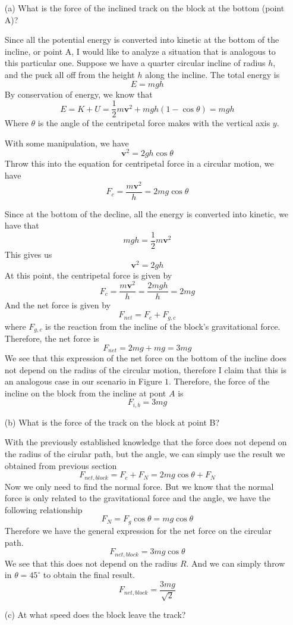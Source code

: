 \documentclass[12pt]{article}
\begin{document}
\begin{itemize}
\begin{enumerate}
    \item[(a)] What is the force of the inclined track on the block at the bottom (point A)?
    
    Since all the potential energy is converted into kinetic at the bottom of the incline, or point A, I would like to analyze a situation that is analogous to this particular one. Suppose we have a quarter circular incline of radius $h$, and the puck all off from the height $h$ along the incline. The total energy is
    \[
    E = mgh
    \]
    By conservation of energy, we know that
    \[
    E = K + U = \frac{1}{2}m\mathbf{v}^2 + mgh(1-\cos\theta) = mgh
    \]
    Where $\theta$ is the angle of the centripetal force makes with the vertical axis $y$. 

    With some manipulation, we have
    \[
    \mathbf{v}^2   = 2gh\cos\theta
    \]
    Throw this into the equation for centripetal force in a circular motion, we have
    \[
    F_c = \frac{m\mathbf{v}^2 }{h} = 2mg\cos\theta
    \]

    Since at the bottom of the decline, all the energy is converted into kinetic, we have that
    \[
    mgh = \frac{1}{2}m\mathbf{v}^2
    \]
    This gives us
    \[
    \mathbf{v}^2 = 2gh
    \]
    At this point, the centripetal force is given by
    \[
    F_c = \frac{m\mathbf{v}^2}{h} = \frac{2mgh}{h} = 2mg
    \]
    And the net force is given by
    \[
    F_{net} = F_c + F_{g,c} 
    \]
    where $F_{g,c}$ is the reaction from the incline of the block's gravitational force. Therefore, the net force is
    \[
    F_{net} = 2mg + mg = 3mg
    \]
    We see that this expression of the net force on the bottom of the incline does not depend on the radius of the circular motion, therefore I claim that this is an analogous case in our scenario in Figure $1$. Therefore, the force of the incline on the block from the incline at pont $A$ is
    \[
    F_{i,b} = 3mg
    \]

    
    \item[(b)] What is the force of the track on the block at point B?

    With the previously established knowledge that the force does not depend on the radius of the cirular path, but the angle, we can simply use the result we obtained from previous section
    \[
    F_{net,block} = F_{c} + F_{N} = 2mg\cos\theta + F_N
    \]
    Now we only need to find the normal force. But we know that the normal force is only related to the gravitational force and the angle, we have the following relationship
    \[
    F_N = F_g\cos\theta = mg\cos\theta
    \]
    Therefore we have the general expression for the net force on the circular path.
    \[
    F_{net,block} = 3mg\cos\theta
    \]
    We see that this does not depend on the radius $R$. And we can simply throw in $\theta = 45^\circ$ to obtain the final result.
    \[
    F_{net,block} = \frac{3mg}{\sqrt{2}}
    \]
    \item[(c)] At what speed does the block leave the track?


\end{enumerate}
\end{itemize}
\end{document}
